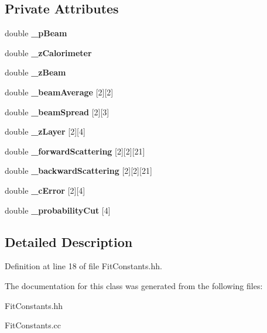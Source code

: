 \subsection*{Private Attributes}
\begin{DoxyCompactItemize}
\item 
double {\bfseries \_\-pBeam}\label{classTBTrack_1_1FitConstants_ad065c37d27302f166d583e92ff813e08}

\item 
double {\bfseries \_\-zCalorimeter}\label{classTBTrack_1_1FitConstants_aed3664e51cc6fc58c48e8b2f9ced4b32}

\item 
double {\bfseries \_\-zBeam}\label{classTBTrack_1_1FitConstants_a038e07323028e6f0307fa69685359301}

\item 
double {\bfseries \_\-beamAverage} [2][2]\label{classTBTrack_1_1FitConstants_a701a22a05bbfdc8678fbb11f0a4a6242}

\item 
double {\bfseries \_\-beamSpread} [2][3]\label{classTBTrack_1_1FitConstants_a4d9da5ca3637928a5248e53e6b42cef8}

\item 
double {\bfseries \_\-zLayer} [2][4]\label{classTBTrack_1_1FitConstants_a93f27485f5ce91ac23ffbb9febf4f8f7}

\item 
double {\bfseries \_\-forwardScattering} [2][2][21]\label{classTBTrack_1_1FitConstants_a4a9803ee41a2659da3513e4df42fd349}

\item 
double {\bfseries \_\-backwardScattering} [2][2][21]\label{classTBTrack_1_1FitConstants_ab45f453a56ff58df89b085202ee14bf3}

\item 
double {\bfseries \_\-cError} [2][4]\label{classTBTrack_1_1FitConstants_a2fafd67579669f4e2c291fd30370be36}

\item 
double {\bfseries \_\-probabilityCut} [4]\label{classTBTrack_1_1FitConstants_a7c1fb70c3f9c89d6213b34ccdf88dc67}

\end{DoxyCompactItemize}


\subsection{Detailed Description}


Definition at line 18 of file FitConstants.hh.

The documentation for this class was generated from the following files:\begin{DoxyCompactItemize}
\item 
FitConstants.hh\item 
FitConstants.cc\end{DoxyCompactItemize}
